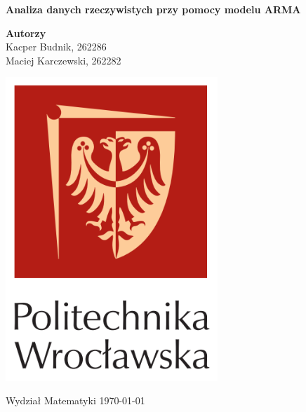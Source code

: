 \documentclass[12pt]{article}
\theoremstyle{exer}
\begin{document}
	\begin{titlepage}
		\begin{center}
			
			\textbf{\Huge  Analiza danych rzeczywistych przy pomocy modelu ARMA}
			
			\vspace{0.5cm}
			
			\vspace{1.5cm}
			
			\textbf{\LARGE Autorzy}\\
			\vspace{0.5cm}
			\large Kacper Budnik, 262286\\
			\large Maciej Karczewski, 262282\\
			
			
			\vfill
			
			\vspace{0.4cm}
				\includegraphics[width=0.60\textwidth]{img/logo.PNG}

			
			\vspace{0.8cm}
			Wydział Matematyki	
			\today
		\end{center}
	\end{titlepage}
	\tableofcontents
	\newpage
	
\end{document}
